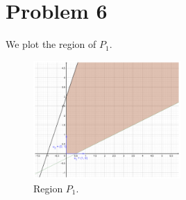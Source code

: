 \documentclass[12pt]{article}
\begin{document}
\section*{Problem 6}
We plot the region of $P_1$.

\begin{figure}[htbp]
  \caption{Region $P_1$.}
  \centering
    \includegraphics[width=0.5\textwidth]{p6.pdf}
\end{figure}

\FloatBarrier
\end{document}
